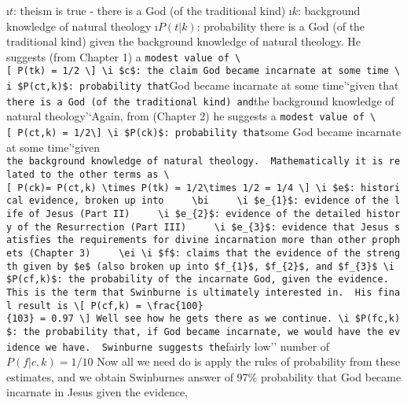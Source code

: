 \documentclass{tufte-book}
\begin{document}
\bi
\i \(t\): theism is true - there is a God (of the traditional kind)
\i \(k\): background knowledge of natural theology \i \(P(t|k)\):
probability there is a God (of the traditional kind) given the
background knowledge of natural theology. He suggests (from Chapter 1) a
\texttt{modest\textquotesingle{}\textquotesingle{}\ value\ of\ \textbackslash{}{[}\ P(t\textbar{}k)\ =\ 1/2\ \textbackslash{}{]}\ \textbackslash{}i\ \$c\$:\ the\ claim\ God\ became\ incarnate\ at\ some\ time\ \textbackslash{}i\ \$P(c\textbar{}t,k)\$:\ probability\ that}God
became incarnate at some time'`given that
\texttt{there\ is\ a\ God\ (of\ the\ traditional\ kind)\textquotesingle{}\textquotesingle{}\ and}the
background knowledge of natural theology'`Again, from (Chapter 2) he
suggests a
\texttt{modest\textquotesingle{}\textquotesingle{}\ value\ of\ \textbackslash{}{[}\ P(c\textbar{}t,k)\ =\ 1/2\textbackslash{}{]}\ \textbackslash{}i\ \$P(c\textbar{}k)\$:\ probability\ that}some
God became incarnate at some time'`given
\texttt{the\ background\ knowledge\ of\ natural\ theology\textquotesingle{}\textquotesingle{}.\ \ Mathematically\ it\ is\ related\ to\ the\ other\ terms\ as\ \textbackslash{}{[}\ P(c\textbar{}k)=\ P(c\textbar{}t,k)\ \textbackslash{}times\ P(t\textbar{}k)\ =\ 1/2\textbackslash{}times\ 1/2\ =\ 1/4\ \textbackslash{}{]}\ \textbackslash{}i\ \$e\$:\ historical\ evidence,\ broken\ up\ into\ \ \ \ \ \textbackslash{}bi\ \ \ \ \ \textbackslash{}i\ \$e\_\{1\}\$:\ evidence\ of\ the\ life\ of\ Jesus\ (Part\ II)\ \ \ \ \ \textbackslash{}i\ \$e\_\{2\}\$:\ evidence\ of\ the\ detailed\ history\ of\ the\ Resurrection\ (Part\ III)\ \ \ \ \ \textbackslash{}i\ \$e\_\{3\}\$:\ evidence\ that\ Jesus\ satisfies\ the\ requirements\ for\ divine\ incarnation\ more\ than\ other\ prophets\ (Chapter\ 3)\ \ \ \ \ \textbackslash{}ei\ \textbackslash{}i\ \$f\$:\ claims\ that\ the\ evidence\ of\ the\ strength\ given\ by\ \$e\$\ (also\ broken\ up\ into\ \$f\_\{1\}\$,\ \$f\_\{2\}\$,\ and\ \$f\_\{3\}\$\ \textbackslash{}i\ \$P(c\textbar{}f,k)\$:\ the\ probability\ of\ the\ incarnate\ God,\ given\ the\ evidence.\ \ This\ is\ the\ term\ that\ Swinburne\ is\ ultimately\ interested\ in.\ \ His\ final\ result\ is\ \textbackslash{}{[}\ P(c\textbar{}f,k)\ =\ \textbackslash{}frac\{100\}\{103\}\ =\ 0.97\ \textbackslash{}{]}\ We\textquotesingle{}ll\ see\ how\ he\ gets\ there\ as\ we\ continue.\ \textbackslash{}i\ \$P(f\textbar{}c,k)\$:\ the\ probability\ that,\ if\ God\ became\ incarnate,\ we\ would\ have\ the\ evidence\ we\ have.\ \ Swinburne\ suggests\ the}fairly
low'' number of \(P(f|c,k) = 1/10\) \ei
Now all we need do is apply the rules of probability from these
estimates, and we obtain Swinburnes answer of 97\% probability that God
became incarnate in Jesus given the evidence,
\end{document}
